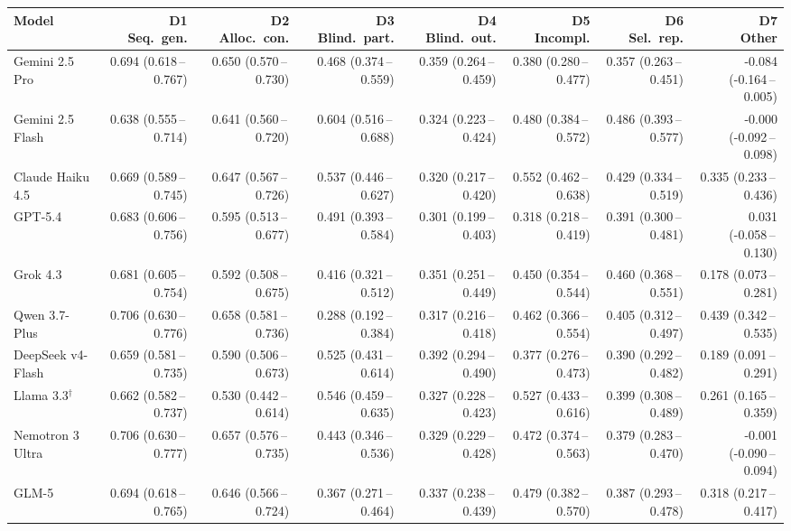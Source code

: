 \begin{tabular}{lrrrrrrr}
\toprule
Model & \makecell{D1\\Seq.\ gen.} & \makecell{D2\\Alloc.\ con.} & \makecell{D3\\Blind.\ part.} & \makecell{D4\\Blind.\ out.} & \makecell{D5\\Incompl.} & \makecell{D6\\Sel.\ rep.} & \makecell{D7\\Other} \\
\midrule
Gemini 2.5 Pro & 0.694 (0.618\,--\,0.767) & 0.650 (0.570\,--\,0.730) & 0.468 (0.374\,--\,0.559) & 0.359 (0.264\,--\,0.459) & 0.380 (0.280\,--\,0.477) & 0.357 (0.263\,--\,0.451) & -0.084 (-0.164\,--\,0.005) \\
Gemini 2.5 Flash & 0.638 (0.555\,--\,0.714) & 0.641 (0.560\,--\,0.720) & 0.604 (0.516\,--\,0.688) & 0.324 (0.223\,--\,0.424) & 0.480 (0.384\,--\,0.572) & 0.486 (0.393\,--\,0.577) & -0.000 (-0.092\,--\,0.098) \\
Claude Haiku 4.5 & 0.669 (0.589\,--\,0.745) & 0.647 (0.567\,--\,0.726) & 0.537 (0.446\,--\,0.627) & 0.320 (0.217\,--\,0.420) & 0.552 (0.462\,--\,0.638) & 0.429 (0.334\,--\,0.519) & 0.335 (0.233\,--\,0.436) \\
GPT-5.4 & 0.683 (0.606\,--\,0.756) & 0.595 (0.513\,--\,0.677) & 0.491 (0.393\,--\,0.584) & 0.301 (0.199\,--\,0.403) & 0.318 (0.218\,--\,0.419) & 0.391 (0.300\,--\,0.481) & 0.031 (-0.058\,--\,0.130) \\
Grok 4.3 & 0.681 (0.605\,--\,0.754) & 0.592 (0.508\,--\,0.675) & 0.416 (0.321\,--\,0.512) & 0.351 (0.251\,--\,0.449) & 0.450 (0.354\,--\,0.544) & 0.460 (0.368\,--\,0.551) & 0.178 (0.073\,--\,0.281) \\
Qwen 3.7-Plus & 0.706 (0.630\,--\,0.776) & 0.658 (0.581\,--\,0.736) & 0.288 (0.192\,--\,0.384) & 0.317 (0.216\,--\,0.418) & 0.462 (0.366\,--\,0.554) & 0.405 (0.312\,--\,0.497) & 0.439 (0.342\,--\,0.535) \\
DeepSeek v4-Flash & 0.659 (0.581\,--\,0.735) & 0.590 (0.506\,--\,0.673) & 0.525 (0.431\,--\,0.614) & 0.392 (0.294\,--\,0.490) & 0.377 (0.276\,--\,0.473) & 0.390 (0.292\,--\,0.482) & 0.189 (0.091\,--\,0.291) \\
Llama 3.3$^\dagger$ & 0.662 (0.582\,--\,0.737) & 0.530 (0.442\,--\,0.614) & 0.546 (0.459\,--\,0.635) & 0.327 (0.228\,--\,0.423) & 0.527 (0.433\,--\,0.616) & 0.399 (0.308\,--\,0.489) & 0.261 (0.165\,--\,0.359) \\
Nemotron 3 Ultra & 0.706 (0.630\,--\,0.777) & 0.657 (0.576\,--\,0.735) & 0.443 (0.346\,--\,0.536) & 0.329 (0.229\,--\,0.428) & 0.472 (0.374\,--\,0.563) & 0.379 (0.283\,--\,0.470) & -0.001 (-0.090\,--\,0.094) \\
GLM-5 & 0.694 (0.618\,--\,0.765) & 0.646 (0.566\,--\,0.724) & 0.367 (0.271\,--\,0.464) & 0.337 (0.238\,--\,0.439) & 0.479 (0.382\,--\,0.570) & 0.387 (0.293\,--\,0.478) & 0.318 (0.217\,--\,0.417) \\
\bottomrule
\end{tabular}
